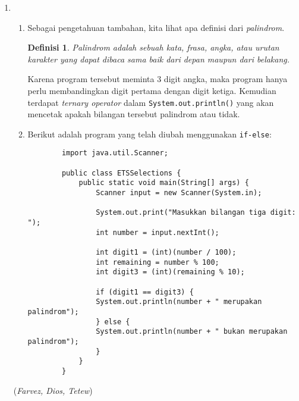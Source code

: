 \documentclass{article}
\newtheorem*{definisi}{Definisi}
\begin{document}
\begin{enumerate}
        \item \begin{enumerate}
            \item Sebagai pengetahuan tambahan, kita lihat apa definisi dari \textit{palindrom}.
            \begin{definisi}
                Palindrom adalah sebuah kata, frasa, angka, atau urutan karakter yang dapat dibaca sama baik dari depan maupun dari belakang.
            \end{definisi}
            Karena program tersebut meminta 3 digit angka, maka program hanya perlu membandingkan digit pertama dengan digit ketiga. Kemudian terdapat \textit{ternary operator} dalam \texttt{System.out.println()} yang akan mencetak apakah bilangan tersebut palindrom atau tidak.

            \item Berikut adalah program yang telah diubah menggunakan \texttt{if-else}:
            \begin{verbatim}
        import java.util.Scanner;
        
        public class ETSSelections {
            public static void main(String[] args) {
                Scanner input = new Scanner(System.in);
            
                System.out.print("Masukkan bilangan tiga digit: ");
                int number = input.nextInt();
            
                int digit1 = (int)(number / 100);
                int remaining = number % 100;
                int digit3 = (int)(remaining % 10);
            
                if (digit1 == digit3) {
                System.out.println(number + " merupakan palindrom");
                } else {
                System.out.println(number + " bukan merupakan palindrom");
                }
            }
        }
            \end{verbatim}
        \end{enumerate}
        \begin{flushright}
            (\textit{Farvez, Dios, Tetew})
        \end{flushright}
        

\end{enumerate}
\end{document}
